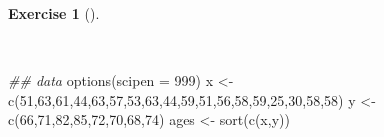 \documentclass[
  a4paper,
]{scrreport}
\newenvironment{Shaded}{\begin{snugshade}}{\end{snugshade}}
\newcommand{\AttributeTok}[1]{\textcolor[rgb]{0.40,0.45,0.13}{#1}}
\newcommand{\DecValTok}[1]{\textcolor[rgb]{0.68,0.00,0.00}{#1}}
\newcommand{\DocumentationTok}[1]{\textcolor[rgb]{0.37,0.37,0.37}{\textit{#1}}}
\newcommand{\FunctionTok}[1]{\textcolor[rgb]{0.28,0.35,0.67}{#1}}
\newcommand{\NormalTok}[1]{\textcolor[rgb]{0.00,0.23,0.31}{#1}}
\newcommand{\OtherTok}[1]{\textcolor[rgb]{0.00,0.23,0.31}{#1}}
\theoremstyle{definition}
\newtheorem{exercise}{Exercise}[chapter]
\theoremstyle{remark}
\begin{document}
\begin{exercise}[]\protect\hypertarget{exr-1}{}\label{exr-1}

~

\begin{Shaded}
\begin{Highlighting}[]
\DocumentationTok{\#\# data}
\FunctionTok{options}\NormalTok{(}\AttributeTok{scipen =} \DecValTok{999}\NormalTok{)}
\NormalTok{x }\OtherTok{\textless{}{-}} \FunctionTok{c}\NormalTok{(}\DecValTok{51}\NormalTok{,}\DecValTok{63}\NormalTok{,}\DecValTok{61}\NormalTok{,}\DecValTok{44}\NormalTok{,}\DecValTok{63}\NormalTok{,}\DecValTok{57}\NormalTok{,}\DecValTok{53}\NormalTok{,}\DecValTok{63}\NormalTok{,}\DecValTok{44}\NormalTok{,}\DecValTok{59}\NormalTok{,}\DecValTok{51}\NormalTok{,}\DecValTok{56}\NormalTok{,}\DecValTok{58}\NormalTok{,}\DecValTok{59}\NormalTok{,}\DecValTok{25}\NormalTok{,}\DecValTok{30}\NormalTok{,}\DecValTok{58}\NormalTok{,}\DecValTok{58}\NormalTok{)}
\NormalTok{y }\OtherTok{\textless{}{-}} \FunctionTok{c}\NormalTok{(}\DecValTok{66}\NormalTok{,}\DecValTok{71}\NormalTok{,}\DecValTok{82}\NormalTok{,}\DecValTok{85}\NormalTok{,}\DecValTok{72}\NormalTok{,}\DecValTok{70}\NormalTok{,}\DecValTok{68}\NormalTok{,}\DecValTok{74}\NormalTok{)}
\NormalTok{ages }\OtherTok{\textless{}{-}} \FunctionTok{sort}\NormalTok{(}\FunctionTok{c}\NormalTok{(x,y))}


\end{Highlighting}
\end{Shaded}
\end{exercise}
\end{document}
